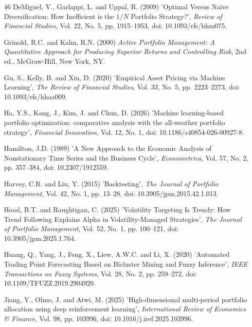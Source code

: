 \documentclass{singlecol-new}
\theoremstyle{TH}{
\newtheorem{lemma}{Lemma}
\newtheorem{theorem}[lemma]{Theorem}
\newtheorem{corrolary}[lemma]{Corrolary}
\newtheorem{conjecture}[lemma]{Conjecture}
\newtheorem{proposition}[lemma]{Proposition}
\newtheorem{claim}[lemma]{Claim}
\newtheorem{stheorem}[lemma]{Wrong Theorem}
\newtheorem{algorithm}{Algorithm}
}
\theoremstyle{THrm}{
\newtheorem{definition}{Definition}[section]
\newtheorem{question}{Question}[section]
\newtheorem{remark}{Remark}
\newtheorem{scheme}{Scheme}
}
\theoremstyle{THhit}{
\newtheorem{case}{Case}[section]
}
\begin{document}
\begin{thebibliography}{46}
DeMiguel, V., Garlappi, L. and Uppal, R. (2009) 'Optimal Versus Naive Diversification: How Inefficient is the $1/N$ Portfolio Strategy?', {\it Review of Financial Studies}, Vol. 22, No. 5, pp. 1915--1953, doi: 10.1093/rfs/hhm075.

Grinold, R.C. and Kahn, R.N. (2000) {\it Active Portfolio Management: A Quantitative Approach for Producing Superior Returns and Controlling Risk}, 2nd ed., McGraw-Hill, New York, NY.

Gu, S., Kelly, B. and Xiu, D. (2020) 'Empirical Asset Pricing via Machine Learning', {\it The Review of Financial Studies}, Vol. 33, No. 5, pp. 2223--2273, doi: 10.1093/rfs/hhaa009.

Ha, Y.S., Kang, J., Kim, J. and Chun, D. (2026) 'Machine learning-based portfolio optimization: comparative analysis with the all-weather portfolio strategy', {\it Financial Innovation}, Vol. 12, No. 1, doi: 10.1186/s40854-026-00927-8.

Hamilton, J.D. (1989) 'A New Approach to the Economic Analysis of Nonstationary Time Series and the Business Cycle', {\it Econometrica}, Vol. 57, No. 2, pp. 357--384, doi: 10.2307/1912559.

Harvey, C.R. and Liu, Y. (2015) 'Backtesting', {\it The Journal of Portfolio Management}, Vol. 42, No. 1, pp. 13--28, doi: 10.3905/jpm.2015.42.1.013.

Hood, B.T. and Raughtigan, C. (2025) 'Volatility Targeting Is Trendy: How Trend Following Explains Alpha in Volatility-Managed Strategies', {\it The Journal of Portfolio Management}, Vol. 52, No. 1, pp. 100--121, doi: 10.3905/jpm.2025.1.764.

Huang, Q., Yang, J., Feng, X., Liew, A.W.C. and Li, X. (2020) 'Automated Trading Point Forecasting Based on Bicluster Mining and Fuzzy Inference', {\it IEEE Transactions on Fuzzy Systems}, Vol. 28, No. 2, pp. 259--272, doi: 10.1109/TFUZZ.2019.2904920.

Jiang, Y., Olmo, J. and Atwi, M. (2025) 'High-dimensional multi-period portfolio allocation using deep reinforcement learning', {\it International Review of Economics \& Finance}, Vol. 98, pp. 103996, doi: 10.1016/j.iref.2025.103996.


\end{thebibliography}
\end{document}
